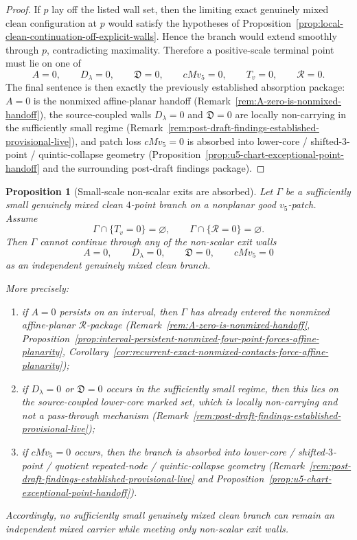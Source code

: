 \documentclass[11pt,a4paper]{amsart}
\theoremstyle{plain}
\newtheorem{proposition}[theorem]{Proposition}
\theoremstyle{definition}
\begin{document}
\begin{proof}
If $p$ lay off the listed wall set, then the limiting exact genuinely mixed clean
configuration at $p$ would satisfy the hypotheses of
Proposition~\ref{prop:local-clean-continuation-off-explicit-walls}. Hence the
branch would extend smoothly through $p$, contradicting maximality. Therefore a
positive-scale terminal point must lie on one of
\[
A=0,\qquad D_\lambda=0,\qquad \mathfrak D=0,\qquad cMv_5=0,\qquad
T_v=0,\qquad \mathcal R=0.
\]
The final sentence is then exactly the previously established absorption
package: $A=0$ is the nonmixed affine-planar handoff
(Remark~\ref{rem:A-zero-is-nonmixed-handoff}), the source-coupled walls
$D_\lambda=0$ and $\mathfrak D=0$ are locally non-carrying in the sufficiently
small regime (Remark~\ref{rem:post-draft-findings-established-provisional-live}),
and patch loss $cMv_5=0$ is absorbed into lower-core / shifted-$3$-point /
quintic-collapse geometry
(Proposition~\ref{prop:u5-chart-exceptional-point-handoff} and the surrounding
post-draft findings package).
\end{proof}

\begin{proposition}[Small-scale non-scalar exits are absorbed]
\label{prop:small-scale-non-scalar-exits-absorbed}
Let $\Gamma$ be a sufficiently small genuinely mixed clean $4$-point branch on a
nonplanar good $v_5$-patch. Assume
\[
\Gamma\cap\{T_v=0\}=\varnothing,
\qquad
\Gamma\cap\{\mathcal R=0\}=\varnothing.
\]
Then $\Gamma$ cannot continue through any of the non-scalar exit walls
\[
A=0,\qquad D_\lambda=0,\qquad \mathfrak D=0,\qquad cMv_5=0
\]
as an independent genuinely mixed clean branch.

More precisely:
\begin{enumerate}
\item if $A=0$ persists on an interval, then $\Gamma$ has already entered the
nonmixed affine-planar $\mathcal R$-package
(Remark~\ref{rem:A-zero-is-nonmixed-handoff},
Proposition~\ref{prop:interval-persistent-nonmixed-four-point-forces-affine-planarity},
Corollary~\ref{cor:recurrent-exact-nonmixed-contacts-force-affine-planarity});

\item if $D_\lambda=0$ or $\mathfrak D=0$ occurs in the sufficiently small
regime, then this lies on the source-coupled lower-core marked set, which is
locally non-carrying and not a pass-through mechanism
(Remark~\ref{rem:post-draft-findings-established-provisional-live});

\item if $cMv_5=0$ occurs, then the branch is absorbed into lower-core /
shifted-$3$-point / quotient repeated-node / quintic-collapse geometry
(Remark~\ref{rem:post-draft-findings-established-provisional-live} and
Proposition~\ref{prop:u5-chart-exceptional-point-handoff}).
\end{enumerate}

Accordingly, no sufficiently small genuinely mixed clean branch can remain an
independent mixed carrier while meeting only non-scalar exit walls.
\end{proposition}
\end{document}
